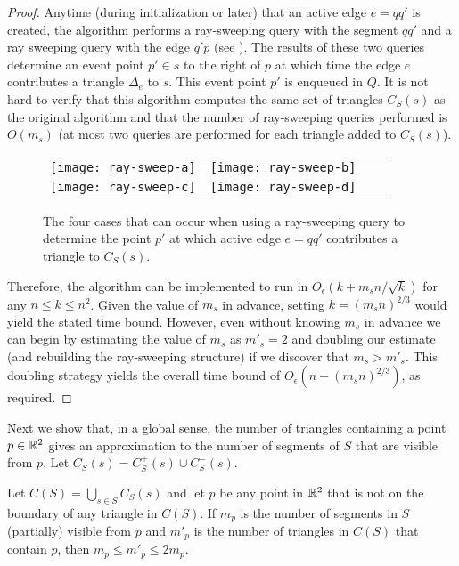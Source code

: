 \documentclass{patmorin}
\newcommand{\Oe}{O_\epsilon}
\begin{document}
\begin{proof}
Anytime (during initialization or later) that an active edge $e=qq'$
is created, the algorithm performs a ray-sweeping query with the
segment $qq'$ and a ray sweeping query with the edge $q'p$ (see
).  The results of these two queries determine an event
point $p'\in s$ to the right of $p$ at which time the edge $e$ contributes
a triangle $\Delta_e$ to $s$. This event point $p'$ is enqueued in $Q$.
It is not hard to verify that this algorithm computes the same set of
triangles $C_S(s)$ as the original algorithm and that the number of
ray-sweeping queries performed is $O(m_s)$ (at most two queries are
performed for each triangle added to $C_S(s)$).
\begin{figure}
  \begin{center}
    \begin{tabular}{cccc}
    \texttt{[image: ray-sweep-a]} &
    \texttt{[image: ray-sweep-b]} \\
    \texttt{[image: ray-sweep-c]} &
    \texttt{[image: ray-sweep-d]} \\
    \end{tabular}
  \end{center}
  \caption{The four cases that can occur when using a ray-sweeping query
           to determine the point $p'$ at which active edge
           $e=qq'$ contributes a triangle to $C_S(s)$.}
\end{figure}
Therefore, the algorithm can be implemented to run in $\Oe(k +
m_sn/\sqrt{k})$ for any $n\le k\le n^2$.  Given the value of $m_s$
in advance, setting $k=(m_s n)^{2/3}$ would yield the stated time
bound.  However, even without knowing $m_s$ in advance we can begin by
estimating the value of $m_s$ as $m'_s = 2$ and doubling our estimate
(and rebuilding the ray-sweeping structure) if we discover that $m_s >
m'_s$.  This doubling strategy yields the overall time bound of $\Oe(n+(m_s
n)^{2/3})$, as required.
\end{proof}

Next we show that, in a global sense, the number of triangles containing a
point $p\in\mathbb{R}^2$ gives an approximation to the number of segments of $S$
that are visible from $p$. Let $C_S(s) = C^+_S(s)\cup C^-_S(s)$.

\begin{lem}
Let $C(S)=\bigcup_{s\in S} C_S(s)$ and let $p$ be any point in $\mathbb{R}^2$ that
is not on the boundary of any triangle in $C(S)$.  If $m_p$ is the number
of segments in $S$ (partially) visible from $p$ and $m'_p$ is the number
of triangles in $C(S)$ that contain $p$, then $m_p \le m'_p \le 2m_p$.
\end{lem}
\end{document}
